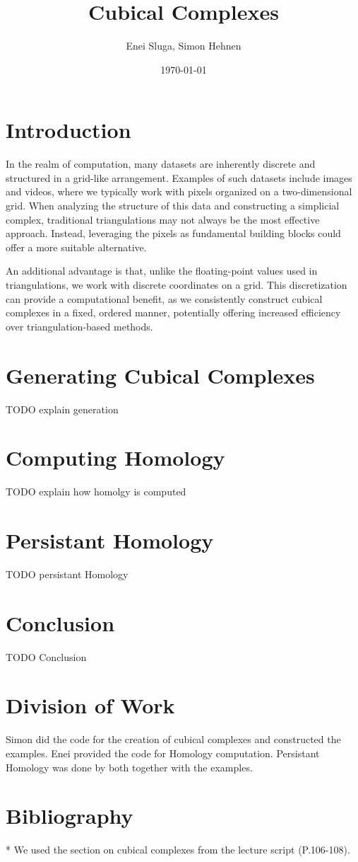 \documentclass{article}
\title{Cubical Complexes} %
\author{Enei Sluga, Simon Hehnen} %
\affil
{
    Faculty of Computer and Information Science \\
    University of Ljubljana %
}
\date{\today} %
\begin{document}
    \maketitle

    \section{Introduction}
    In the realm of computation, many datasets are inherently discrete and structured in a
    grid-like arrangement. Examples of such datasets include images and videos,
    where we typically work with pixels organized on a two-dimensional grid.
    When analyzing the structure of this data and constructing a simplicial complex,
    traditional triangulations may not always be the most effective approach.
    Instead, leveraging the pixels as fundamental building blocks could offer a
    more suitable alternative.
    
    An additional advantage is that, unlike the floating-point values used in triangulations,
    we work with discrete coordinates on a grid. This discretization can provide a
    computational benefit, as we consistently construct cubical complexes in a fixed,
    ordered manner, potentially offering increased efficiency over triangulation-based methods.
    
    \section{Generating Cubical Complexes}
    TODO explain generation

    \section{Computing Homology}
    TODO explain how homolgy is computed

    \section{Persistant Homology}
    TODO persistant Homology

    \section{Conclusion}
    TODO Conclusion

    \section{Division of Work}
    Simon did the code for the creation of cubical complexes and constructed the examples.
    Enei provided the code for Homology computation.
    Persistant Homology was done by both together with the examples.

    \section{Bibliography}*
    We used the section on cubical complexes from the lecture script (P.106-108).
\end{document}
